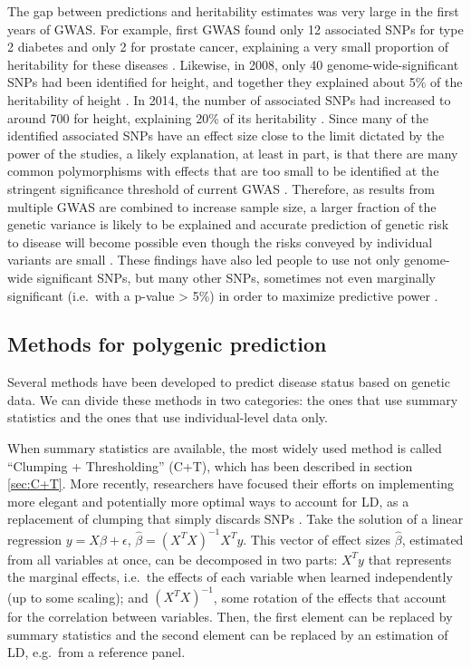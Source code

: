 The gap between predictions and heritability estimates was very large in the first years of GWAS.
For example, first GWAS found only 12 associated SNPs for type 2 diabetes and only 2 for prostate cancer, explaining a very small proportion of heritability for these diseases \cite[]{jakobsdottir2009interpretation}. 
Likewise, in 2008, only 40 genome-wide-significant SNPs had been identified for height, and together they explained about 5\% of the heritability of height \cite[]{manolio2009finding}. In 2014, the number of associated SNPs had increased to around 700 for height, explaining 20\% of its heritability \cite[]{wood2014defining}.
Since many of the identified associated SNPs have an effect size close to the limit dictated by the power of the studies, a likely explanation, at least in part, is that there are many common polymorphisms with effects that are too small to be identified at the stringent significance threshold of current GWAS \cite[]{wray2008prediction}.
Therefore, as results from multiple GWAS are combined to increase sample size, a larger fraction of the genetic variance is likely to be explained and accurate prediction of genetic risk to disease will become possible even though the risks conveyed by individual variants are small \cite[]{wray2008prediction,wray2018common}.
These findings have also led people to use not only genome-wide significant SNPs, but many other SNPs, sometimes not even marginally significant (i.e.\ with a p-value > 5\%) in order to maximize predictive power \cite[]{purcell2009common,Dudbridge2013,wray2014research}.


\subsection{Methods for polygenic prediction}

Several methods have been developed to predict disease status based on genetic data.
We can divide these methods in two categories: the ones that use summary statistics and the ones that use individual-level data only.

When summary statistics are available, the most widely used method is called ``Clumping + Thresholding'' (C+T), which has been described in section \ref{sec:C+T}.
More recently, researchers have focused their efforts on implementing more elegant and potentially more optimal ways to account for LD, as a replacement of clumping that simply discards SNPs \cite[]{vilhjalmsson2015modeling,mak2017polygenic,chun2019non,ge2019polygenic}. 
Take the solution of a linear regression $y = X \beta + \epsilon$, $\hat{\beta} = \left(X^T X\right)^{-1} X^T y$. This vector of effect sizes $\hat{\beta}$, estimated from all variables at once, can be decomposed in two parts: $X^T y$ that represents the marginal effects, i.e.\ the effects of each variable when learned independently (up to some scaling); and $\left(X^T X\right)^{-1}$, some rotation of the effects that account for the correlation between variables.
Then, the first element can be replaced by summary statistics and the second element can be replaced by an estimation of LD, e.g.\ from a reference panel.

